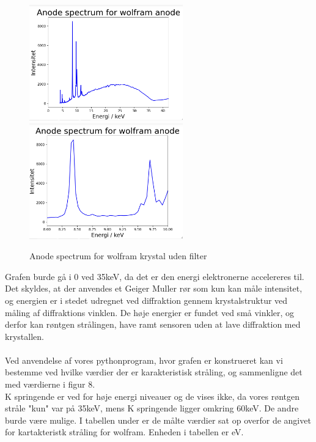 \documentclass[a4paper,twoside]{article}
\begin{document}
\begin{figure}[H]
\begin{centering}
\includegraphics[height=5cm]{Wolfram krystal.png}
\includegraphics[height=5cm]{zoomed in.png}
\hspace{1cm}
\par\end{centering}
\caption{\label{cap:2ien} Anode spectrum for wolfram krystal uden filter }
\end{figure}
Grafen burde gå i 0 ved 35keV, da det er den energi elektronerne accelereres til. Det skyldes, at der anvendes et Geiger Muller rør som kun kan måle intensitet, og energien er i stedet udregnet ved diffraktion gennem krystalstruktur ved måling af diffraktions vinklen. De høje energier er fundet ved små vinkler, og derfor kan røntgen strålingen, have ramt sensoren uden at lave diffraktion med krystallen.\\\\
Ved anvendelse af vores pythonprogram, hvor grafen er konstrueret kan vi bestemme ved hvilke værdier der er karakteristisk stråling, og sammenligne det med værdierne i figur 8. 
\\ K springende er ved for høje energi niveauer og  de vises ikke, da vores røntgen stråle "kun" var på 35keV, mens K springende ligger omkring 60keV. De andre burde være mulige. I tabellen under er de målte værdier sat op overfor de angivet for kartakteristk stråling for wolfram. Enheden i tabellen er eV.
\end{document}
